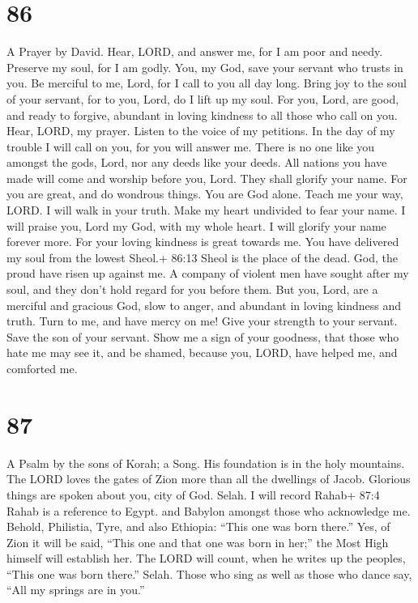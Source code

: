 \hypertarget{section-76}{%
\section{86}\label{section-76}}

A Prayer by David.  Hear, LORD, and answer me, for I am poor
and needy.  Preserve my soul, for I am godly. You, my God,
save your servant who trusts in you.  Be merciful to me,
Lord, for I call to you all day long.  Bring joy to the soul
of your servant, for to you, Lord, do I lift up my soul. 
For you, Lord, are good, and ready to forgive, abundant in loving
kindness to all those who call on you.  Hear, LORD, my
prayer. Listen to the voice of my petitions.  In the day of
my trouble I will call on you, for you will answer me. 
There is no one like you amongst the gods, Lord, nor any deeds like your
deeds.  All nations you have made will come and worship
before you, Lord. They shall glorify your name.  For you
are great, and do wondrous things. You are God alone. 
Teach me your way, LORD. I will walk in your truth. Make my heart
undivided to fear your name.  I will praise you, Lord my
God, with my whole heart. I will glorify your name forever more.
 For your loving kindness is great towards me. You have
delivered my soul from the lowest Sheol.+ 86:13 Sheol is the place of
the dead.  God, the proud have risen up against me. A
company of violent men have sought after my soul, and they don't hold
regard for you before them.  But you, Lord, are a merciful
and gracious God, slow to anger, and abundant in loving kindness and
truth.  Turn to me, and have mercy on me! Give your
strength to your servant. Save the son of your servant. 
Show me a sign of your goodness, that those who hate me may see it, and
be shamed, because you, LORD, have helped me, and comforted me.

\hypertarget{section-77}{%
\section{87}\label{section-77}}

A Psalm by the sons of Korah; a Song.  His foundation is in
the holy mountains.  The LORD loves the gates of Zion more
than all the dwellings of Jacob.  Glorious things are spoken
about you, city of God. Selah.  I will record Rahab+ 87:4
Rahab is a reference to Egypt. and Babylon amongst those who acknowledge
me. Behold, Philistia, Tyre, and also Ethiopia: ``This one was born
there.''  Yes, of Zion it will be said, ``This one and that
one was born in her;'' the Most High himself will establish her.
 The LORD will count, when he writes up the peoples, ``This
one was born there.'' Selah.  Those who sing as well as
those who dance say, ``All my springs are in you.''

